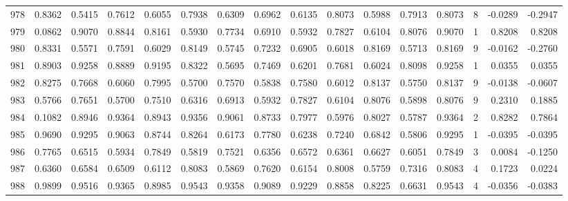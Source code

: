 \begin{tabular}{lrrrrrrrrrrrrrrr}
978 &      0.8362 &  0.5415 &  0.7612 &  0.6055 &  0.7938 &  0.6309 &  0.6962 &  0.6135 &  0.8073 &  0.5988 &   0.7913 &     0.8073 &      8 &                   -0.0289 &                    -0.2947 \\
979 &      0.0862 &  0.9070 &  0.8844 &  0.8161 &  0.5930 &  0.7734 &  0.6910 &  0.5932 &  0.7827 &  0.6104 &   0.8076 &     0.9070 &      1 &                    0.8208 &                     0.8208 \\
980 &      0.8331 &  0.5571 &  0.7591 &  0.6029 &  0.8149 &  0.5745 &  0.7232 &  0.6905 &  0.6018 &  0.8169 &   0.5713 &     0.8169 &      9 &                   -0.0162 &                    -0.2760 \\
981 &      0.8903 &  0.9258 &  0.8889 &  0.9195 &  0.8322 &  0.5695 &  0.7469 &  0.6201 &  0.7681 &  0.6024 &   0.8098 &     0.9258 &      1 &                    0.0355 &                     0.0355 \\
982 &      0.8275 &  0.7668 &  0.6060 &  0.7995 &  0.5700 &  0.7570 &  0.5838 &  0.7580 &  0.6012 &  0.8137 &   0.5750 &     0.8137 &      9 &                   -0.0138 &                    -0.0607 \\
983 &      0.5766 &  0.7651 &  0.5700 &  0.7510 &  0.6316 &  0.6913 &  0.5932 &  0.7827 &  0.6104 &  0.8076 &   0.5898 &     0.8076 &      9 &                    0.2310 &                     0.1885 \\
984 &      0.1082 &  0.8946 &  0.9364 &  0.8943 &  0.9356 &  0.9061 &  0.8733 &  0.7977 &  0.5976 &  0.8027 &   0.5787 &     0.9364 &      2 &                    0.8282 &                     0.7864 \\
985 &      0.9690 &  0.9295 &  0.9063 &  0.8744 &  0.8264 &  0.6173 &  0.7780 &  0.6238 &  0.7240 &  0.6842 &   0.5806 &     0.9295 &      1 &                   -0.0395 &                    -0.0395 \\
986 &      0.7765 &  0.6515 &  0.5934 &  0.7849 &  0.5819 &  0.7521 &  0.6356 &  0.6572 &  0.6361 &  0.6627 &   0.6051 &     0.7849 &      3 &                    0.0084 &                    -0.1250 \\
987 &      0.6360 &  0.6584 &  0.6509 &  0.6112 &  0.8083 &  0.5869 &  0.7620 &  0.6154 &  0.8008 &  0.5759 &   0.7316 &     0.8083 &      4 &                    0.1723 &                     0.0224 \\
988 &      0.9899 &  0.9516 &  0.9365 &  0.8985 &  0.9543 &  0.9358 &  0.9089 &  0.9229 &  0.8858 &  0.8225 &   0.6631 &     0.9543 &      4 &                   -0.0356 &                    -0.0383 \\

\end{tabular}
